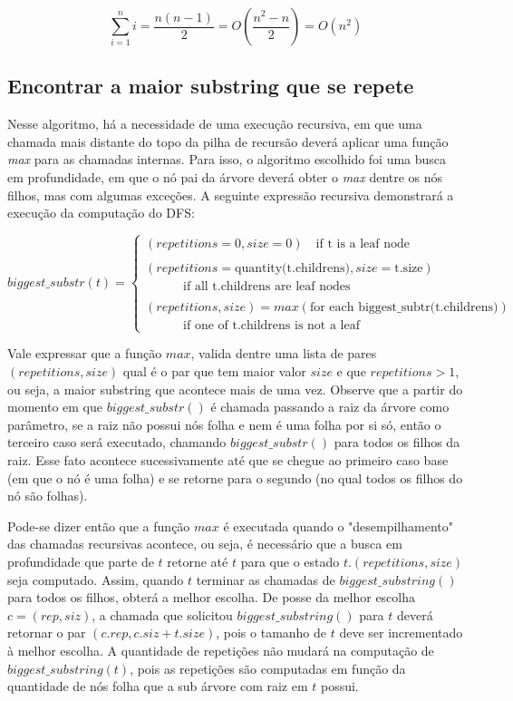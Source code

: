 $$\sum_{i=1}^{n}i = \frac{n(n-1)}{2} = O(\frac{n^2-n}{2}) = O(n^2)$$


\subsection{Encontrar a maior substring que se repete}
Nesse algoritmo, há a necessidade de uma execução recursiva, em que uma chamada
mais distante do topo da pilha de recursão deverá aplicar uma função
\textit{max} para as chamadas internas.
Para isso, o algoritmo escolhido foi uma busca em profundidade, em que o nó
pai da árvore deverá obter o \textit{max} dentre os nós filhos, mas com algumas
exceções.
A seguinte expressão recursiva demonstrará a execução da computação do DFS:

\[ biggest\_substr(t) = 
    \begin{cases}
        (repetitions = 0, size = 0) \quad \text{if t is a leaf node} \\
        \\
        (repetitions = \text{quantity(t.childrens)}, size = \text{t.size}) \\
        \quad \quad \quad \text{if all t.childrens are leaf nodes}\\
        \\
        (repetitions, size) = max(\text{for each biggest\_subtr(t.childrens)}) \\
         \quad \quad \quad \text{if one of t.childrens is not a leaf}
    \end{cases}
\]

Vale expressar que a função $max$, valida dentre uma lista de pares
$(repetitions, size)$ qual é o par que tem maior valor $size$ e que
$repetitions > 1$, ou seja, a maior substring que acontece mais de uma vez.
Observe que a partir do momento em que $biggest\_substr()$ é chamada passando
a raiz da árvore como parâmetro, se a raiz não possui nós folha e nem é uma folha
por si só, então o terceiro caso será executado, chamando $biggest\_substr()$
para todos os filhos da raiz.
Esse fato acontece sucessivamente até que se chegue ao primeiro caso base (em
que o nó é uma folha) e se retorne para o segundo (no qual todos os filhos do
nó são folhas).

Pode-se dizer então que a função $max$ é executada quando o "desempilhamento"
das chamadas recursivas acontece, ou seja, é necessário que a busca em
profundidade que parte de $t$ retorne até $t$ para que o estado $t.(repetitions,
size)$ seja computado.
Assim, quando $t$ terminar as chamadas de $biggest\_substring()$ para todos os
filhos, obterá a melhor escolha.
De posse da melhor escolha $c = (rep, siz)$, a chamada que solicitou
$biggest\_substring()$ para $t$ deverá retornar o par $(c.rep, c.siz + t.size)$,
pois o tamanho de $t$ deve ser incrementado à melhor escolha.
A quantidade de repetições não mudará na computação de $biggest\_substring(t)$,
pois as repetições são computadas em função da quantidade de nós folha que a
sub árvore com raiz em $t$ possui.

